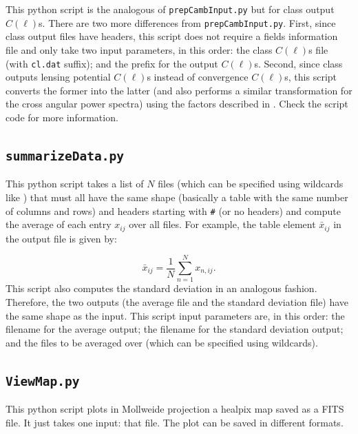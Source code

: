 \documentclass[12pt]{book} %
\begin{document}
This {\sc python} script is the analogous of {\tt prepCambInput.py} but for {\sc class} 
output $C(\ell)$s. There are two more differences from {\tt prepCambInput.py}. First, since 
{\sc class} output files have headers, this script does not require a fields information 
file and only take two input parameters, in  this order: the {\sc class} $C(\ell)$s file 
(with {\tt cl.dat} suffix); and the prefix for the output $C(\ell)$s. Second, since 
{\sc class} outputs lensing potential $C(\ell)$s instead of convergence $C(\ell)$s, this script 
converts the former into the latter (and also performs a similar transformation for the cross angular power spectra) using the 
factors described in \citet{Hu00x}. Check the script code for more information. 

\subsection{{\tt summarizeData.py}}
\label{sec:summarizedata}

This {\sc python} script takes a list of $N$ files (which can be specified using wildcards like {\tt *}) 
that must all have the same shape (basically a table with the same number of columns and rows) 
and headers starting with {\tt \#} (or no headers) and compute the average of each entry $x_{ij}$ over all files. 
For example, the table element $\bar{x}_{ij}$ in the output file is given by:

\begin{equation}
\bar{x}_{ij} = \frac{1}{N}\sum_{n=1}^{N}x_{n,ij}.
\label{eq:average}
\end{equation}
This script also computes the standard deviation in an analogous fashion. 
Therefore, the two outputs (the average file and the standard deviation file) have 
the same shape as the input. This script input parameters are, in this order: 
the filename for the average output; the filename for the standard deviation output; 
and the files to be averaged over (which can be specified using wildcards).

\subsection{{\tt ViewMap.py}}
\label{sec:viewmap}

This {\sc python} script plots in Mollweide projection a {\sc healpix} map saved as a FITS file. 
It just takes one input: that file. The plot can be saved in different formats.  




\end{document}
